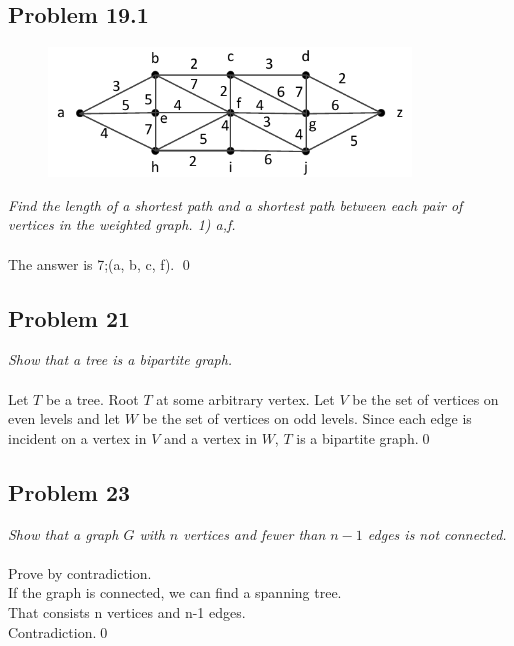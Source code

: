\documentclass[
        handout,
        ]{beamer}
\begin{document}
    \subsection{Problem 19.1}
        \begin{frame}[c]{\subsecname}
            \begin{figure}
                \centering
                \includegraphics[width=96.3mm]{tut11p17_1}
            \end{figure}
            \emph{Find the length of a shortest path and a shortest path between each pair of
vertices in the weighted graph. 1) a,f.}\\$\;$\\\pause
            The answer is 7;(a, b, c, f). \qed
        \end{frame}


    \subsection{Problem 21}
        \begin{frame}[c]{\subsecname}
            \emph{Show that a tree is a bipartite graph.}\\$\;$\\\pause
            Let $T$ be a tree. Root $T$ at some arbitrary vertex. Let $V$ be the set of vertices on even levels and let $W$ be the set of vertices on odd levels. Since each edge is incident on a vertex in $V$ and a vertex in $W$, $T$ is a bipartite graph.\qed
        \end{frame}



    \subsection{Problem 23}
        \begin{frame}[c]{\subsecname}
            \emph{Show that a graph $G$ with $n$ vertices and fewer than $n-1$ edges is not connected.}\\$\;$\\\pause
            Prove by contradiction.\\
            If the graph is connected, we can find a spanning tree. \\That consists n vertices and n-1 edges. \\Contradiction.\qed
        \end{frame}
\end{document}
